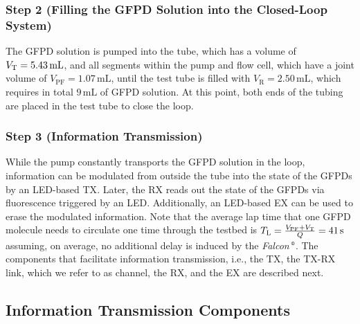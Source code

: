 \subsubsection{Step 2 (Filling the GFPD Solution into the Closed-Loop System)} \label{SubSec:Filling}
\scaleSubsubsectionBelow
%
The \ac{GFPD} solution is pumped into the tube, which has a volume of $V_{\mathrm{T}} = 5.43 \,\si{\milli\liter}$, and all segments within the pump and flow cell, which have a joint volume of $V_\mathrm{PF} = 1.07 \,\si{\milli\liter}$, until the test tube is filled with $V_\mathrm{R} = 2.50 \,\si{\milli\liter}$, which requires in total $9 \,\si{\milli\liter}$ of \ac{GFPD} solution. At this point, both ends of the tubing are placed in the test tube to close the loop.
%
\scaleSubsubsection
\subsubsection{Step 3 (Information Transmission)} \label{SubSec:Transmission}
\scaleSubsubsectionBelow
%
While the pump constantly transports the \ac{GFPD} solution in the loop, information can be modulated from outside the tube into the state of the \acp{GFPD} by an \ac{LED}-based \ac{TX}. Later, the \ac{RX} reads out the state of the \acp{GFPD} via fluorescence triggered by an \ac{LED}. Additionally, an \ac{LED}-based \ac{EX} can be used to erase the modulated information. Note that the average lap time that one \ac{GFPD} molecule needs to circulate one time through the testbed is $T_\mathrm{L} = \frac{V_\mathrm{PF} + V_{\mathrm{T}}}{Q} = 41 \,\si{\second}$ assuming, on average, no additional delay is induced by the \textit{Falcon}$\,\textsuperscript{\tiny\textregistered}$. The components that facilitate information transmission, i.e., the \ac{TX}, the \ac{TX}-\ac{RX} link, which we refer to as channel, the \ac{RX}, and the \ac{EX} are described next.
%
\scaleSubsection
\subsection{Information Transmission Components} \label{SubSec:InfComp}
\scaleSubsectionBelow
\scaleSubsubsection
